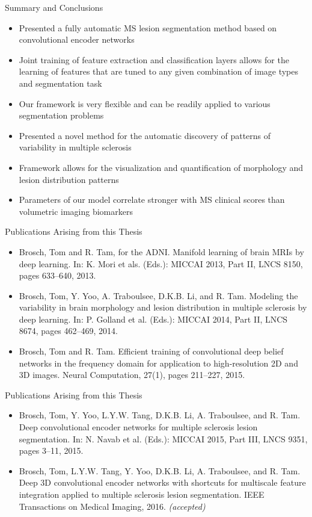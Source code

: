\documentclass{beamer}
\begin{document}
\begin{frame}{Summary and Conclusions} %
\begin{itemize}
\item Presented a fully automatic MS lesion segmentation method based on
convolutional encoder networks
\item Joint training of feature extraction and classification layers allows for
the learning of features that are tuned to any given combination of image types
and segmentation task
\item Our framework is very flexible and can be readily applied to various
segmentation problems
\vspace{0.5em}
\item Presented a novel method for the automatic discovery of patterns of
variability in multiple sclerosis
\item Framework allows for the visualization and quantification of morphology
and lesion distribution patterns
\item Parameters of our model correlate stronger with MS clinical scores than
volumetric imaging biomarkers
\end{itemize}
\end{frame}

\begin{frame}{Publications Arising from this Thesis}
\begin{itemize}
\item Brosch, Tom and R. Tam, for the ADNI. Manifold learning of brain MRIs
by deep learning. In: K. Mori et als. (Eds.): MICCAI 2013, Part II, LNCS 8150,
pages 633--640, 2013.
\item Brosch, Tom, Y. Yoo, A. Traboulsee, D.K.B. Li, and R. Tam. Modeling the
variability in brain morphology and lesion distribution in multiple sclerosis by
deep learning. In: P. Golland et al. (Eds.): MICCAI 2014, Part II, LNCS 8674,
pages 462--469, 2014.
\item Brosch, Tom and R. Tam. Efficient training of convolutional deep
belief networks in the frequency domain for application to high-resolution 2D
and 3D images. Neural Computation, 27(1), pages 211--227, 2015.
\end{itemize}
\end{frame}

\begin{frame}{Publications Arising from this Thesis}
\begin{itemize}
\item Brosch, Tom, Y. Yoo, L.Y.W. Tang, D.K.B. Li, A. Traboulsee, and R. Tam.
Deep convolutional encoder networks for multiple sclerosis lesion segmentation.
In: N. Navab et al. (Eds.): MICCAI 2015, Part III, LNCS 9351, pages 3--11, 2015.
\item Brosch, Tom, L.Y.W. Tang, Y. Yoo, D.K.B. Li, A. Traboulsee, and R. Tam.
Deep 3D convolutional encoder networks with shortcuts for multiscale feature
integration applied to multiple sclerosis lesion segmentation. IEEE Transactions
on Medical Imaging, 2016. \emph{(accepted)}
\end{itemize}
\end{frame}
\end{document}
